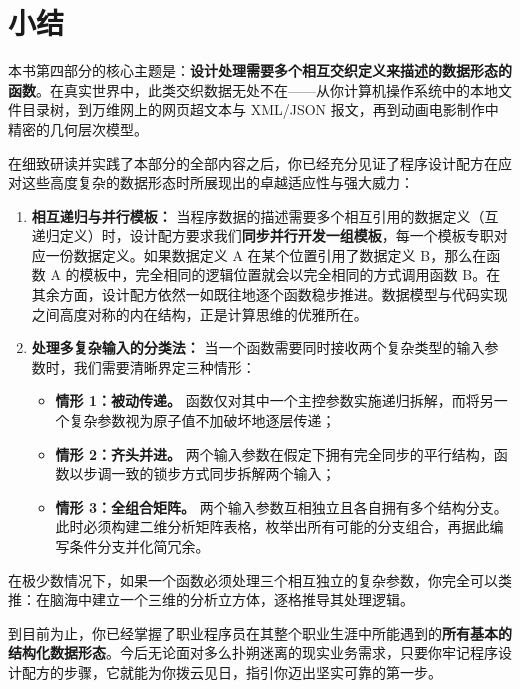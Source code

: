 
\chapter{小结}
\label{sec:ch24_summary}

本书第四部分的核心主题是：\textbf{设计处理需要多个相互交织定义来描述的数据形态的函数}。在真实世界中，此类交织数据无处不在——从你计算机操作系统中的本地文件目录树，到万维网上的网页超文本与 XML/JSON 报文，再到动画电影制作中精密的几何层次模型。

在细致研读并实践了本部分的全部内容之后，你已经充分见证了程序设计配方在应对这些高度复杂的数据形态时所展现出的卓越适应性与强大威力：

\begin{enumerate}
  \item \textbf{相互递归与并行模板：} 当程序数据的描述需要多个相互引用的数据定义（互递归定义）时，设计配方要求我们\textbf{同步并行开发一组模板}，每一个模板专职对应一份数据定义。如果数据定义 A 在某个位置引用了数据定义 B，那么在函数 A 的模板中，完全相同的逻辑位置就会以完全相同的方式调用函数 B。在其余方面，设计配方依然一如既往地逐个函数稳步推进。数据模型与代码实现之间高度对称的内在结构，正是计算思维的优雅所在。

  \item \textbf{处理多复杂输入的分类法：} 当一个函数需要同时接收两个复杂类型的输入参数时，我们需要清晰界定三种情形：
  \begin{itemize}
    \item \textbf{情形 1：被动传递。} 函数仅对其中一个主控参数实施递归拆解，而将另一个复杂参数视为原子值不加破坏地逐层传递；
    \item \textbf{情形 2：齐头并进。} 两个输入参数在假定下拥有完全同步的平行结构，函数以步调一致的锁步方式同步拆解两个输入；
    \item \textbf{情形 3：全组合矩阵。} 两个输入参数互相独立且各自拥有多个结构分支。此时必须构建二维分析矩阵表格，枚举出所有可能的分支组合，再据此编写条件分支并化简冗余。
  \end{itemize}
\end{enumerate}

在极少数情况下，如果一个函数必须处理三个相互独立的复杂参数，你完全可以类推：在脑海中建立一个三维的分析立方体，逐格推导其处理逻辑。

到目前为止，你已经掌握了职业程序员在其整个职业生涯中所能遇到的\textbf{所有基本的结构化数据形态}。今后无论面对多么扑朔迷离的现实业务需求，只要你牢记程序设计配方的步骤，它就能为你拨云见日，指引你迈出坚实可靠的第一步。
